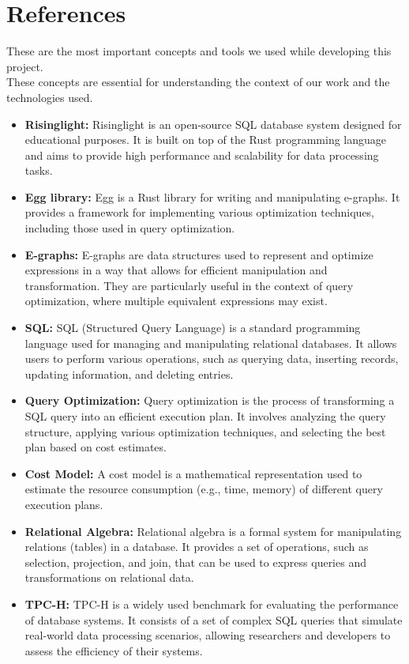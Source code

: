 \documentclass[a4paper,12pt]{scrreprt}
\begin{document}
\section{References}
These are the most important concepts and tools we used while developing this project. \\
These concepts are essential for understanding the context of our work and the technologies used.

\begin{itemize}
    \item \textbf{Risinglight:} Risinglight is an open-source SQL database system designed for educational purposes. It is built on top of the Rust programming language and aims to provide high performance and scalability for data processing tasks.
    \item \textbf{Egg library:} Egg is a Rust library for writing and manipulating e-graphs. It provides a framework for implementing various optimization techniques, including those used in query optimization.
    \item \textbf{E-graphs:} E-graphs are data structures used to represent and optimize expressions in a way that allows for efficient manipulation and transformation. They are particularly useful in the context of query optimization, where multiple equivalent expressions may exist.
    \item \textbf{SQL:} SQL (Structured Query Language) is a standard programming language used for managing and manipulating relational databases. It allows users to perform various operations, such as querying data, inserting records, updating information, and deleting entries.
    \item \textbf{Query Optimization:} Query optimization is the process of transforming a SQL query into an efficient execution plan. It involves analyzing the query structure, applying various optimization techniques, and selecting the best plan based on cost estimates.
    \item \textbf{Cost Model:} A cost model is a mathematical representation used to estimate the resource consumption (e.g., time, memory) of different query execution plans.
    \item \textbf{Relational Algebra:} Relational algebra is a formal system for manipulating relations (tables) in a database. It provides a set of operations, such as selection, projection, and join, that can be used to express queries and transformations on relational data.
    \item \textbf{TPC-H:} TPC-H is a widely used benchmark for evaluating the performance of database systems. It consists of a set of complex SQL queries that simulate real-world data processing scenarios, allowing researchers and developers to assess the efficiency of their systems.

\end{itemize}
\end{document}
